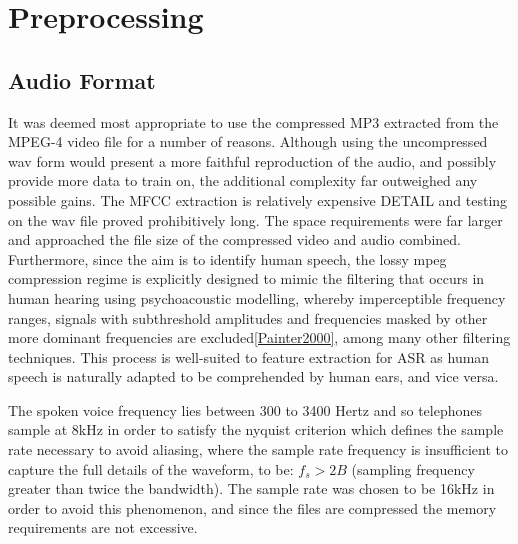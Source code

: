 
\chapter{Preprocessing} %

\label{Chapter2} %


\newcommand{\keyword}[1]{\textbf{#1}}
\newcommand{\tabhead}[1]{\textbf{#1}}
\newcommand{\code}[1]{\texttt{#1}}
\newcommand{\file}[1]{\texttt{\bfseries#1}}
\newcommand{\option}[1]{\texttt{\itshape#1}}


\section{Audio Format}
It was deemed most appropriate to use the compressed MP3 extracted from the MPEG-4 video file for a number of reasons. Although using the uncompressed wav form would present a more faithful reproduction of the audio, and possibly provide more data to train on, the additional complexity far outweighed any possible gains. The MFCC extraction is relatively expensive DETAIL and testing on the wav file proved prohibitively long. The space requirements were far larger and approached the file size of the compressed video and audio combined. Furthermore, since the aim is to identify human speech, the lossy mpeg compression regime is explicitly designed to mimic the filtering that occurs in human hearing using psychoacoustic modelling, whereby imperceptible frequency ranges, signals with subthreshold amplitudes and frequencies masked by other more dominant frequencies are excluded\ref{Painter2000}, among many other filtering techniques. This process is well-suited to feature extraction for ASR as human speech is naturally adapted to be comprehended by human ears, and vice versa. 

The  spoken  voice  frequency  lies between  300  to  3400  Hertz\cite{Sandanalakshmi} and so telephones sample at 8kHz in order to satisfy the nyquist criterion which defines the sample rate necessary to avoid aliasing, where the sample rate frequency is insufficient to capture the full details of the waveform, to be: $f_{s} > 2B$ (sampling frequency greater than twice the bandwidth). 
The sample rate was chosen to be 16kHz in order to avoid this phenomenon, and since the files are compressed the memory requirements are not excessive.

